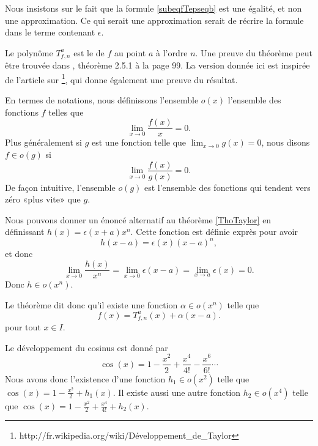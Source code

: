 Nous insistons sur le fait que la formule \eqref{subeqfTepseqb} est une égalité, et non une approximation. Ce qui serait une approximation serait de récrire la formule dans le terme contenant $\epsilon$.

Le polynôme $T^a_{f,n}$ est le  de $f$ au point $a$ à l'ordre $n$.  Une preuve du théorème peut être trouvée dans \cite{TrenchRealAnalisys}, théorème 2.5.1 à la page 99. La version donnée ici est inspirée de l'article sur \footnote{http://fr.wikipedia.org/wiki/Développement\_de\_Taylor}, qui donne également une preuve du résultat.

En termes de notations, nous définissons l'ensemble $o(x)$ l'ensemble des fonctions $f$ telles que
\begin{equation}
	\lim_{x\to 0} \frac{ f(x) }{ x }=0.
\end{equation}
Plus généralement si $g$ est une fonction telle que $\lim_{x\to 0} g(x)=0$, nous disons $f\in o(g)$ si
\begin{equation}
	\lim_{x\to 0} \frac{ f(x) }{ g(x) }=0.
\end{equation}
De façon intuitive, l'ensemble $o(g)$ est l'ensemble des fonctions qui tendent vers zéro «plus vite» que $g$.


Nous pouvons donner un énoncé alternatif au théorème \ref{ThoTaylor} en définissant $h(x)=\epsilon(x+a)x^n$. Cette fonction est définie exprès pour avoir
\begin{equation}
	h(x-a)=\epsilon(x)(x-a)^n,
\end{equation}
et donc
\begin{equation}
	\lim_{x\to 0} \frac{ h(x) }{ x^n }=\lim_{x\to 0} \epsilon(x-a)=\lim_{x\to a}\epsilon(x)=0. 
\end{equation}
Donc $h\in o(x^n)$.

Le théorème dit donc qu'il existe une fonction $\alpha\in o(x^n)$ telle que
\begin{equation}
	f(x)=T^a_{f,n}(x)+\alpha(x-a).
\end{equation}
pour tout $x\in I$. 

\begin{example}
	Le développement du cosinus est donné par
	\begin{equation}
		\cos(x)=1-\frac{ x^2 }{ 2 }+\frac{ x^4 }{ 4! }-\frac{ x^6 }{ 6! }\cdots
	\end{equation}
	Nous avons donc l'existence d'une fonction $h_1\in o(x^2)$ telle que $\cos(x)=1-\frac{ x^2 }{ 2 }+h_1(x)$. Il existe aussi une autre fonction $h_2\in o(x^4)$ telle que $\cos(x)=1-\frac{ x^2 }{ 2 }+\frac{ x^4 }{ 4! }+h_2(x)$.
\end{example}

